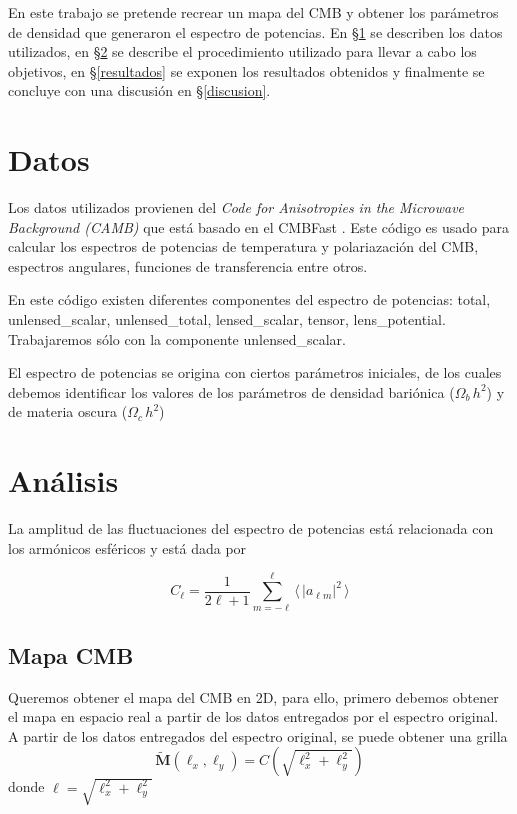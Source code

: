 \documentclass[twocolumn,letterpaper,spanish]{revtex4}
\numberwithin{equation}{section}
\begin{document}
En este trabajo se pretende recrear un mapa del CMB y obtener los par\'ametros de densidad que generaron el espectro de potencias. En §\ref{datos} se describen los datos utilizados, en §\ref{analisis} se describe el procedimiento utilizado para llevar a cabo los objetivos, en §\ref{resultados} se exponen los resultados obtenidos y finalmente se concluye con una discusi\'on en §\ref{discusion}.

\section{Datos}\label{datos}

Los datos utilizados provienen del \textit{Code for Anisotropies in the Microwave Background (CAMB)} que est\'a basado en el CMBFast \citep{cmbfast}. Este c\'odigo es usado para calcular los espectros de potencias de temperatura y polariazaci\'on del CMB, espectros angulares, funciones de transferencia entre otros.

 En este c\'odigo existen diferentes componentes del espectro de potencias: total, unlensed\_scalar, unlensed\_total, lensed\_scalar, tensor, lens\_potential. Trabajaremos s\'olo con la componente unlensed\_scalar.

El espectro de potencias se origina con ciertos par\'ametros iniciales, de los cuales debemos identificar los valores de los par\'ametros de densidad bari\'onica ($\Omega_b\,h^2$) y de materia oscura ($\Omega_c\,h^2$)

\section{An\'alisis}\label{analisis}

La amplitud de las fluctuaciones del espectro de potencias est\'a relacionada con los arm\'onicos esf\'ericos y est\'a dada por


\begin{equation}
C_{\ell} = \frac{1}{2\ell+1}\sum_{m =-\ell}^{\ell}\langle \,|a_{\ell m}|^2\,\rangle
\end{equation}

\subsection{Mapa CMB}\label{mapa}

Queremos obtener el mapa del CMB en 2D, para ello, primero debemos obtener el mapa en espacio real a partir de los datos entregados por el espectro original.
A partir de los datos entregados del espectro original, se puede obtener una grilla 
\begin{equation}
\tilde{\mathbf{M}}(\ell_x,\ell_y)=C\left(\sqrt{\ell_x^2 + \ell_y^2}\right)
\end{equation}
donde $\ell=\sqrt{\ell_x^2 + \ell_y^2}$
\end{document}
